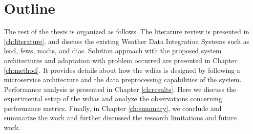 \section{Outline}
The rest of the thesis is organized as follows. The literature review is presented in \cref{ch:literature}, and discuss the existing Weather Data Integration Systems such as \acrshort{lead}, \acrshort{fews}, \acrshort{madis}, and \acrshort{dias}. Solution approach with the proposed system architectures and adaptation with problem occurred are presented in Chapter \ref{ch:method}. It provides details about how the \acrshort{wdias} is designed by following a microservice architecture and the data preprocessing capabilities of the system. Performance analysis is presented in Chapter \ref{ch:results}. Here we discuss the experimental setup of the \acrshort{wdias} and analyze the observations concerning performance metrics. Finally, in Chapter \ref{ch:summary}, we conclude and summarize the work and further discussed the research limitations and future work.
